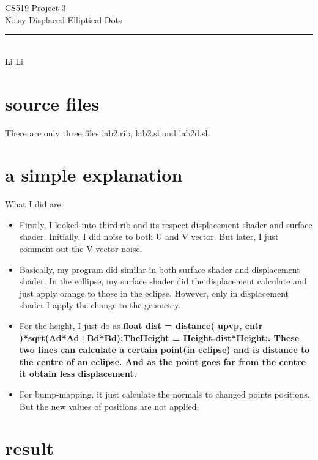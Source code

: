 \documentclass[12pt,letterpaper]{article}
\begin{document}
\begin{titlepage}
    \vspace*{4cm}
    \begin{flushleft}
    {\huge
        CS519 Project 3\\[.5cm]
    }
    {\large
        Noisy Displaced Elliptical Dots
    }
    \end{flushleft}
    \vfill
    \rule{5in}{.5mm}\\
    Li Li

\end{titlepage}
\section{source files}
There are only three files lab2.rib, lab2.sl and lab2d.sl.
\section{a simple explanation}
What I did are:
\begin{itemize}
\item Firstly, I looked into third.rib and its respect displacement shader and surface shader. Initially, I did noise to both U and V vector. But later, I just comment out the V vector noise.
\item Basically, my program did similar in both surface shader and displacement shader. In the ecllipse, my surface shader did the displacement calculate and just apply orange to those in the eclipse. However, only in displacement shader I apply the change to the geometry. 
\item For the height, I just do as \bf{float dist = distance( upvp, cntr )*sqrt(Ad*Ad+Bd*Bd);TheHeight = Height-dist*Height;}. These two lines can calculate a certain point(in eclipse) and is distance to the centre of an eclipse. And as the point goes far from the centre it obtain less displacement.
\item For bump-mapping, it just calculate the normals to changed points positions. But the new values of positions are not applied. 
\end{itemize}
\section{result}
\end{document}
